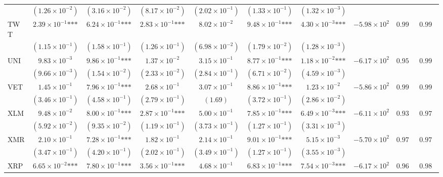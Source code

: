 \documentclass{article}
\begin{document}
\begin{landscape}
\begin{longtable}{lccccccccc}
 & $(1.26\times 10^{-2})$ & $(3.16\times 10^{-2})$ & $(8.17\times 10^{-2})$ & $(2.02\times 10^{-1})$ & $(1.33\times 10^{-1})$ & $(1.32\times 10^{-3})$ &  &  &  \\
TWT & $2.39\times 10^{-1}\text{***}$ & $6.24\times 10^{-1}\text{***}$ & $2.83\times 10^{-1}\text{***}$ & $8.02\times 10^{-2}$ & $9.48\times 10^{-1}\text{***}$ & $4.30\times 10^{-3}\text{***}$ & $-5.98\times 10^{2}$ & $0.993$ & $0.995$ \\
 & $(1.15\times 10^{-1})$ & $(1.58\times 10^{-1})$ & $(1.26\times 10^{-1})$ & $(6.98\times 10^{-2})$ & $(1.79\times 10^{-2})$ & $(1.28\times 10^{-3})$ &  &  &  \\
UNI & $9.83\times 10^{-3}$ & $9.86\times 10^{-1}\text{***}$ & $1.37\times 10^{-2}$ & $3.15\times 10^{-1}$ & $8.77\times 10^{-1}\text{***}$ & $1.18\times 10^{-2}\text{***}$ & $-6.17\times 10^{2}$ & $0.953$ & $0.992$ \\
 & $(9.66\times 10^{-3})$ & $(1.54\times 10^{-2})$ & $(2.33\times 10^{-2})$ & $(2.84\times 10^{-1})$ & $(6.71\times 10^{-2})$ & $(4.59\times 10^{-3})$ &  &  &  \\
VET & $1.45\times 10^{-1}$ & $7.96\times 10^{-1}\text{***}$ & $2.68\times 10^{-1}$ & $3.07\times 10^{-1}$ & $8.86\times 10^{-1}\text{***}$ & $1.23\times 10^{-2}$ & $-5.86\times 10^{2}$ & $0.997$ & $0.996$ \\
 & $(3.46\times 10^{-1})$ & $(4.58\times 10^{-1})$ & $(2.79\times 10^{-1})$ & $(1.69)$ & $(3.72\times 10^{-1})$ & $(2.86\times 10^{-2})$ &  &  &  \\
XLM & $9.48\times 10^{-2}$ & $8.00\times 10^{-1}\text{***}$ & $2.87\times 10^{-1}\text{***}$ & $5.00\times 10^{-1}$ & $7.85\times 10^{-1}\text{***}$ & $6.49\times 10^{-3}\text{***}$ & $-6.11\times 10^{2}$ & $0.933$ & $0.976$ \\
 & $(5.92\times 10^{-2})$ & $(9.35\times 10^{-2})$ & $(1.19\times 10^{-1})$ & $(3.73\times 10^{-1})$ & $(1.27\times 10^{-1})$ & $(3.31\times 10^{-3})$ &  &  &  \\
XMR & $2.10\times 10^{-1}$ & $7.28\times 10^{-1}\text{***}$ & $1.82\times 10^{-1}$ & $2.14\times 10^{-1}$ & $9.01\times 10^{-1}\text{***}$ & $5.15\times 10^{-3}$ & $-5.70\times 10^{2}$ & $0.978$ & $0.979$ \\
 & $(3.47\times 10^{-1})$ & $(4.20\times 10^{-1})$ & $(2.02\times 10^{-1})$ & $(3.49\times 10^{-1})$ & $(1.27\times 10^{-1})$ & $(3.55\times 10^{-3})$ &  &  &  \\
XRP & $6.65\times 10^{-2}\text{***}$ & $7.80\times 10^{-1}\text{***}$ & $3.56\times 10^{-1}\text{***}$ & $4.68\times 10^{-1}$ & $6.83\times 10^{-1}\text{***}$ & $7.54\times 10^{-3}\text{***}$ & $-6.17\times 10^{2}$ & $0.969$ & $0.986$ \\

\end{longtable}
\end{landscape}
\end{document}
